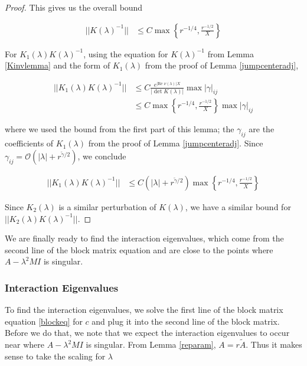 \documentclass[thesis.tex]{subfiles}
\begin{document}
\begin{lemma}
\begin{proof}
This gives us the overall bound

\begin{align*}
||K(\lambda)^{-1}|| &\leq C \max \left\{ r^{-1/4}, \frac{r^{-1/2}}{X} \right\}
\end{align*}

For $K_1(\lambda)K(\lambda)^{-1}$, using the equation for $K(\lambda)^{-1}$ from Lemma \ref{Kinvlemma} and the form of $K_1(\lambda)$ from the proof of Lemma \ref{jumpcenteradj},

\begin{align*}
||K_1(\lambda)K(\lambda)^{-1}|| &\leq 
C \frac{e^{|\text{Re }\nu(\lambda)|X}}{|\det K(\lambda)|} \max {|\gamma|_{ij}} \\
&\leq C \max \left\{ r^{-1/4}, \frac{r^{-1/2}}{X} \right\} \max {|\gamma|_{ij}}
\end{align*}

where we used the bound from the first part of this lemma; the $\gamma_{ij}$ are the coefficients of $K_1(\lambda)$ from the proof of Lemma \ref{jumpcenteradj}. Since $\gamma_{ij} = \mathcal{O}(|\lambda| + r^{\tilde{\gamma}/2})$, we conclude

\begin{align*}
||K_1(\lambda)K(\lambda)^{-1}|| &\leq C (|\lambda| + r^{\tilde{\gamma}/2}) \max \left\{ r^{-1/4}, \frac{r^{-1/2}}{X} \right\}
\end{align*}

Since $K_2(\lambda)$ is a similar perturbation of $K(\lambda)$, we have a similar bound for $||K_2(\lambda)K(\lambda)^{-1}||$.
\end{proof}
\end{lemma}

We are finally ready to find the interaction eigenvalues, which come from the second line of the block matrix equation and are close to the points where $A - \lambda^2 M I$ is singular.

\subsubsection{Interaction Eigenvalues}

To find the interaction eigenvalues, we solve the first line of the block matrix equation \eqref{blockeq} for $c$ and plug it into the second line of the block matrix. Before we do that, we note that we expect the interaction eigenvalues to occur near where $A - \lambda^2 M I$ is singular. From Lemma \ref{reparam}, $A = r \tilde{A}$. Thus it makes sense to take the scaling for $\lambda$
\end{document}
